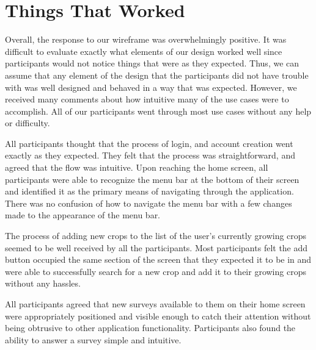 \documentclass[12pt,letterpaper]{article}
\begin{document}
\section{Things That Worked}
Overall, the response to our wireframe was overwhelmingly positive. It was difficult to evaluate exactly what elements of our design worked well since participants would not notice things that were as they expected. Thus, we can assume that any element of the design that the participants did not have trouble with was well designed and behaved in a way that was expected. However, we received many comments about how intuitive many of the use cases were to accomplish. All of our participants went through most use cases without any help or difficulty.\par 
All participants thought that the process of login, and account creation went exactly as they expected. They felt that the process was straightforward, and agreed that the flow was intuitive. Upon reaching the home screen, all participants were able to recognize the menu bar at the bottom of their screen and identified it as the primary means of navigating through the application. There was no confusion of how to navigate the menu bar with a few changes made to the appearance of the menu bar. \par
The process of adding new crops to the list of the user's currently growing crops seemed to be well received by all the participants. Most participants felt the add button occupied the same section of the screen that they expected it to be in and were able to successfully search for a new crop and add it to their growing crops without any hassles.\par
All participants agreed that new surveys available to them on their home screen were appropriately positioned and visible enough to catch their attention without being obtrusive to other application functionality. Participants also found the ability to answer a survey simple and intuitive. \par

\clearpage
\end{document}
